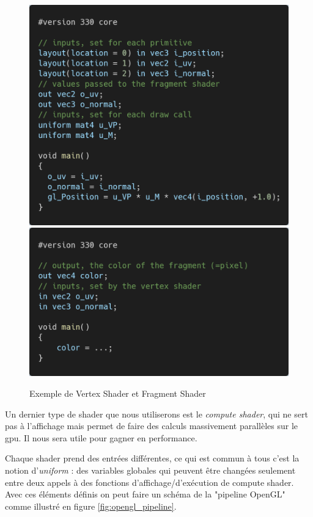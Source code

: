 \documentclass{EPUProjetDi}
\begin{document}
\begin{figure}[ht]
	\centering
	\includegraphics[scale=.2]{vertex_sample}
	\includegraphics[scale=.2]{fragment_sample}
	\caption{Exemple de Vertex Shader et Fragment Shader}
	\label{fig:vs_fs_shaders}
\end{figure}

Un dernier type de shader que nous utiliserons est le \textit{compute shader}, qui ne sert pas à l'affichage mais permet de faire des calculs massivement parallèles sur le gpu. Il nous sera utile pour gagner en performance.
\par
Chaque shader prend des entrées différentes, ce qui est commun à tous c'est la notion d'\textit{uniform} : des variables globales qui peuvent être changées seulement entre deux appels à des fonctions d'affichage/d'exécution de compute shader.
Avec ces éléments définis on peut faire un schéma de la "pipeline OpenGL"  comme illustré en figure \ref{fig:opengl_pipeline}.
\end{document}
